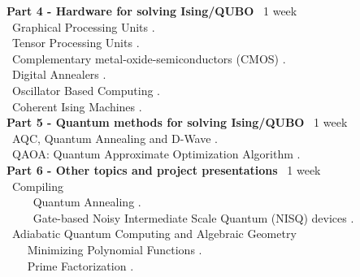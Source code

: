 \documentclass[11pt, a4paper]{article}
\begin{document}
\begin{center}
\begin{minipage}{5in}
\begin{flushleft}
{\bf Part 4 - Hardware for solving Ising/QUBO} \dotfill ~1 week \\
{\color{darkred}{\Rectangle}} ~Graphical Processing Units \cite{yavorsky2019highly,cook2019gpu,romero2019performance}. \\
{\color{darkred}{\Rectangle}} ~Tensor Processing Units \cite{yang2019high}. \\
{\color{darkred}{\Rectangle}} ~Complementary metal-oxide-semiconductors (CMOS) \cite{yamaoka201520k}. \\
{\color{darkred}{\Rectangle}} ~Digital Annealers \cite{aramon2019physics}. \\
{\color{darkred}{\Rectangle}} ~Oscillator Based Computing \cite{chou2019analog,wang2019oim}. \\
{\color{darkred}{\Rectangle}} ~Coherent Ising Machines \cite{roques2020heuristic,inagaki2016coherent,king2018emulating,hamerly2019experimental,tiunov2019annealing,mcmahon2016fully}. \\

{\bf Part 5 - Quantum methods for solving Ising/QUBO} \dotfill ~1 week \\
{\color{darkred}{\Rectangle}} ~AQC, Quantum Annealing and D-Wave \cite{mcgeoch2020theory,albash2018adiabatic,das2008colloquium,santoro2006optimization,farhi2001quantum,kadowaki1998quantum,johnson_quantum_2011}. \\
{\color{darkred}{\Rectangle}} ~QAOA: Quantum Approximate Optimization Algorithm \cite{farhi2014quantum,hadfield2017quantum,hadfield2019quantum}. \\


{\bf Part 6 - Other topics and project presentations} \dotfill ~1 week \\
{\color{darkred}{\Rectangle}} ~Compiling \\
~~~{\color{darkred}{\Rectangle}} ~Quantum Annealing \cite{bernal2019integer,dridi2018novel}. \\
~~~{\color{darkred}{\Rectangle}} ~Gate-based  Noisy Intermediate Scale Quantum (NISQ) devices \cite{dridi2019knuth}. \\
{\color{darkred}{\Rectangle}} ~Adiabatic Quantum Computing and Algebraic Geometry \\
~~~{\color{darkred}{\Rectangle}} Minimizing Polynomial Functions \cite{dridi2019minimizing}.\\
~~~{\color{darkred}{\Rectangle}} Prime Factorization \cite{dridi2017prime}.
\end{flushleft}
\end{minipage}
\end{center}
\end{document}

